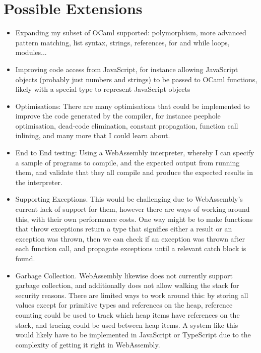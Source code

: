 \documentclass[12pt]{article}
\begin{document}
	\section*{Possible Extensions}
	\begin{itemize}
		\item Expanding my subset of OCaml supported: polymorphism, more advanced pattern matching, list syntax, strings, references, for and while loops, modules...
		
		\item Improving code access from JavaScript, for instance allowing JavaScript objects (probably just numbers and strings) to be passed to OCaml functions, likely with a special type to represent JavaScript objects
		
		\item Optimisations: There are many optimisations that could be implemented to improve the code generated by the compiler, for instance peephole optimisation, dead-code elimination, constant propagation, function call inlining, and many more that I could learn about.
		
		\item End to End testing: Using a WebAssembly interpreter, whereby I can specify a sample of programs to compile, and the expected output from running them, and validate that they all compile and produce the expected results in the interpreter.
		
		\item Supporting Exceptions. This would be challenging due to WebAssembly's current lack of support for them, however there are ways of working around this, with their own performance costs. One way might be to make functions that throw exceptions return a type that signifies either a result or an exception was thrown, then we can check if an exception was thrown after each function call, and propagate exceptions until a relevant catch block is found.
		
		\item Garbage Collection. WebAssembly likewise does not currently support garbage collection, and additionally does not allow walking the stack for security reasons. There are limited ways to work around this: by storing all values except for primitive types and references on the heap, reference counting could be used to track which heap items have references on the stack, and tracing could be used between heap items. A system like this would likely have to be implemented in JavaScript or TypeScript due to the complexity of getting it right in WebAssembly.
		
	\end{itemize}
	
\end{document}

